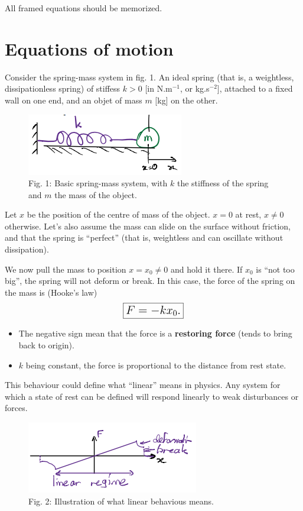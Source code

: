 \documentclass[11pt]{article}
\makeatletter
\def\maxwidth{\ifdim\Gin@nat@width>\linewidth\linewidth
    \else\Gin@nat@width\fi}
\let\Oldincludegraphics\includegraphics
\renewcommand{\includegraphics}[1]{\Oldincludegraphics[width=.8\maxwidth]{#1}}
\makeatother
\begin{document}
All framed equations should be memorized.

    \section{Equations of motion}\label{equations-of-motion}

Consider the spring-mass system in fig. 1. An ideal spring (that is, a
weightless, dissipationless spring) of stiffess \(k > 0\) {[}in
N.m\(^{-1}\), or kg.s\(^{-2}\){]}, attached to a fixed wall on one end,
and an objet of mass \(m\) {[}kg{]} on the other.

\begin{figure}
\centering
\includegraphics{SpringMass.png}
\caption{Fig. 1: Basic spring-mass system, with \(k\) the stiffness of
the spring and \(m\) the mass of the object.}
\end{figure}

Let \(x\) be the position of the centre of mass of the object. \(x=0\)
at rest, \(x\neq 0\) otherwise. Let's also assume the mass can slide on
the surface without friction, and that the spring is ``perfect'' (that
is, weightless and can oscillate without dissipation).

    We now pull the mass to position \(x = x_0 \neq 0\) and hold it there.
If \(x_0\) is ``not too big'', the spring will not deform or break. In
this case, the force of the spring on the mass is (Hooke's law)
\[ \Large \boxed{F = -kx_0.} \]

\begin{itemize}
\item
  The negative sign mean that the force is a \textbf{restoring force}
  (tends to bring back to origin).
\item
  \(k\) being constant, the force is proportional to the distance from
  rest state.
\end{itemize}

This behaviour could define what ``linear'' means in physics. Any system
for which a state of rest can be defined will respond linearly to weak
disturbances or forces.

\begin{figure}
\centering
\includegraphics{Linear.png}
\caption{Fig. 2: Illustration of what linear behavious means.}
\end{figure}
\end{document}
